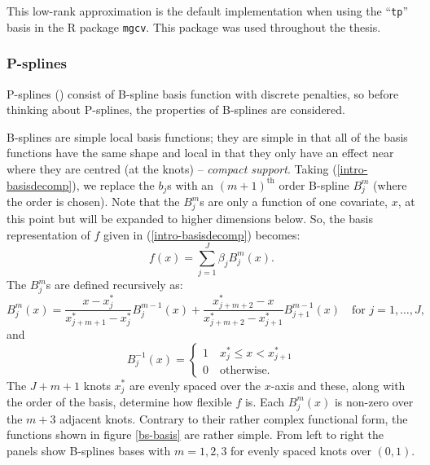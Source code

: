 This low-rank approximation is the default implementation when using the ``\texttt{tp}'' basis in the \textsf{R} package \texttt{mgcv}. This package was used throughout the thesis.

\subsubsection{P-splines}
\label{intro-psplines}

P-splines (\cite{eilersmarx96}) consist of B-spline basis function with discrete penalties, so before thinking about P-splines, the properties of B-splines are considered. 

B-splines are simple local basis functions; they are simple in that all of the basis functions have the same shape and local in that they only have an effect near where they are centred (at the knots) -- \textit{compact support}. Taking (\ref{intro-basisdecomp}), we replace the $b_j$s with an $(m+1)^\text{th}$ order B-spline $B_j^m$ (where the order is chosen). Note that the $B_j^m$s are only a function of one covariate, $x$, at this point but will be expanded to higher dimensions below. So, the basis representation of $f$ given in (\ref{intro-basisdecomp}) becomes:
\begin{equation*}
f(x) = \sum_{j=1}^{J} \beta_j B^m_j(x).
\end{equation*}
The $B_j^m$s are defined recursively as:
\begin{equation*}
B_j^m(x) = \frac{x-x^*_j}{x^*_{j+m+1} - x^*_j} B_j^{m-1}(x) + \frac{x^*_{j+m+2} -x}{x^*_{j+m+2} - x^*_{j+1}} B_{j+1}^{m-1}(x) \quad \text{for } j=1,\ldots,J,
\end{equation*}
and
\begin{equation*}
 B_j^{-1}(x)=\begin{cases}
1 \quad x^*_j \leq x < x^*_{j+1}\\
0 \quad \text{otherwise}. 
\end{cases}
\end{equation*}
The $J+m+1$ knots $x^*_j$ are evenly spaced over the $x$-axis and these, along with the order of the basis, determine how flexible $f$ is. Each $B^m_j(x)$ is non-zero over the $m+3$ adjacent knots. Contrary to their rather complex functional form, the functions shown in figure \ref{bs-basis} are rather simple. From left to right the panels show B-splines bases with $m=1,2,3$ for evenly spaced knots over $(0,1)$.

